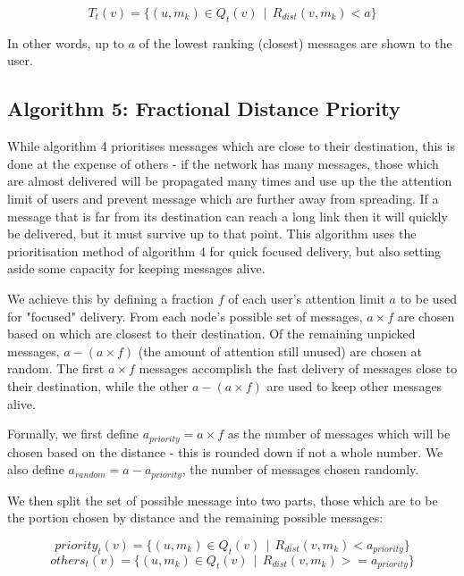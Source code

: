 \documentclass[bsc,frontabs,twoside,singlespacing,parskip,deptreport]{infthesis}     %
\begin{document}
\begin{equation}
T_{t}(v) = \{ (u, m_{k}) \in Q_{t}(v) \:\: | \:\: R_{dist}(v, m_{k}) < a \}
\end{equation}

In other words, up to $a$ of the lowest ranking (closest) messages are shown to the user.

\subsection{Algorithm 5: Fractional Distance Priority}
While algorithm 4 prioritises messages which are close to their destination, this is done at the expense of others - if the network has many messages, those which are almost delivered will be propagated many times and use up the the attention limit of users and prevent message which are further away from spreading. If a message that is far from its destination can reach a long link then it will quickly be delivered, but it must survive up to that point. This algorithm uses the prioritisation method of algorithm 4 for quick focused delivery, but also setting aside some capacity for keeping messages alive.

We achieve this by defining a fraction $f$ of each user's attention limit $a$ to be used for "focused" delivery. From each node's possible set of messages, $a \times f$ are chosen based on which are closest to their destination. Of the remaining unpicked messages, $a - (a \times f)$ (the amount of attention still unused) are chosen at random. The first $a \times f$ messages accomplish the fast delivery of messages close to their destination, while the other $a - (a \times f)$ are used to keep other messages alive.

Formally, we first define $a_{priority} = a \times f$ as the number of messages which will be chosen based on the distance - this is rounded down if not a whole number. We also define $a_{random} = a - a_{priority}$, the number of messages chosen randomly.

We then split the set of possible message into two parts, those which are to be the portion chosen by distance and the remaining possible messages:

\begin{equation}
priority_{t}(v) = \{ (u, m_{k}) \in Q_{t}(v) \:\: | \:\: R_{dist}(v, m_{k}) < a_{priority} \}
\end{equation}
\begin{equation}
others_{t}(v) = \{ (u, m_{k}) \in Q_{t}(v) \:\: | \:\: R_{dist}(v, m_{k}) >= a_{priority} \}
\end{equation}
\end{document}
